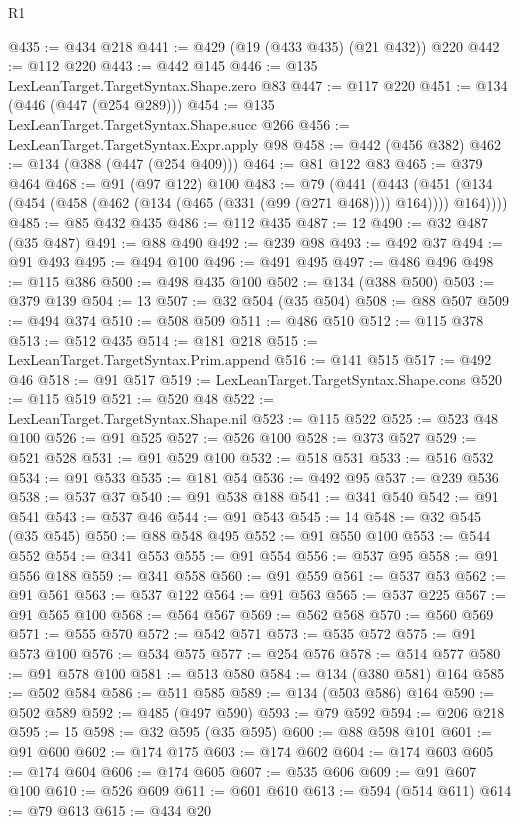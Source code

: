 \begin{lexlean}{R1}
\begin{coremodule}
{{{{{{{{{{{{{{{{{{{{{{{{{{{{{{{{{{{{{{{{{{{{{{{{{{{{{{{{{@435 := @434 @218
@441 := @429 (@19 (@433 @435) (@21 @432)) @220
@442 := @112 @220
@443 := @442 @145
@446 := @135 LexLeanTarget.TargetSyntax.Shape.zero @83
@447 := @117 @220
@451 := @134 (@446 (@447 (@254 @289)))
@454 := @135 LexLeanTarget.TargetSyntax.Shape.succ @266
@456 := LexLeanTarget.TargetSyntax.Expr.apply @98
@458 := @442 (@456 @382)
@462 := @134 (@388 (@447 (@254 @409)))
@464 := @81 @122 @83
@465 := @379 @464
@468 := @91 (@97 @122) @100
@483 := @79
    (@441
      (@443 (@451 (@134 (@454 (@458 (@462 (@134 (@465 (@331 (@99 (@271 @468)))) @164)))) @164))))
@485 := @85 @432 @435
@486 := @112 @435
@487 := 12
@490 := @32 @487 (@35 @487)
@491 := @88 @490
@492 := @239 @98
@493 := @492 @37
@494 := @91 @493
@495 := @494 @100
@496 := @491 @495
@497 := @486 @496
@498 := @115 @386
@500 := @498 @435 @100
@502 := @134 (@388 @500)
@503 := @379 @139
@504 := 13
@507 := @32 @504 (@35 @504)
@508 := @88 @507
@509 := @494 @374
@510 := @508 @509
@511 := @486 @510
@512 := @115 @378
@513 := @512 @435
@514 := @181 @218
@515 := LexLeanTarget.TargetSyntax.Prim.append
@516 := @141 @515
@517 := @492 @46
@518 := @91 @517
@519 := LexLeanTarget.TargetSyntax.Shape.cons
@520 := @115 @519
@521 := @520 @48
@522 := LexLeanTarget.TargetSyntax.Shape.nil
@523 := @115 @522
@525 := @523 @48 @100
@526 := @91 @525
@527 := @526 @100
@528 := @373 @527
@529 := @521 @528
@531 := @91 @529 @100
@532 := @518 @531
@533 := @516 @532
@534 := @91 @533
@535 := @181 @54
@536 := @492 @95
@537 := @239 @536
@538 := @537 @37
@540 := @91 @538 @188
@541 := @341 @540
@542 := @91 @541
@543 := @537 @46
@544 := @91 @543
@545 := 14
@548 := @32 @545 (@35 @545)
@550 := @88 @548 @495
@552 := @91 @550 @100
@553 := @544 @552
@554 := @341 @553
@555 := @91 @554
@556 := @537 @95
@558 := @91 @556 @188
@559 := @341 @558
@560 := @91 @559
@561 := @537 @53
@562 := @91 @561
@563 := @537 @122
@564 := @91 @563
@565 := @537 @225
@567 := @91 @565 @100
@568 := @564 @567
@569 := @562 @568
@570 := @560 @569
@571 := @555 @570
@572 := @542 @571
@573 := @535 @572
@575 := @91 @573 @100
@576 := @534 @575
@577 := @254 @576
@578 := @514 @577
@580 := @91 @578 @100
@581 := @513 @580
@584 := @134 (@380 @581) @164
@585 := @502 @584
@586 := @511 @585
@589 := @134 (@503 @586) @164
@590 := @502 @589
@592 := @485 (@497 @590)
@593 := @79 @592
@594 := @206 @218
@595 := 15
@598 := @32 @595 (@35 @595)
@600 := @88 @598 @101
@601 := @91 @600
@602 := @174 @175
@603 := @174 @602
@604 := @174 @603
@605 := @174 @604
@606 := @174 @605
@607 := @535 @606
@609 := @91 @607 @100
@610 := @526 @609
@611 := @601 @610
@613 := @594 (@514 @611)
@614 := @79 @613
@615 := @434 @20
}}}}}}}}}}}}}}}}}}}}}}}}}}}}}}}}}}}}}}}}}}}}}}}}}}}}}}}}}
\end{coremodule}
\end{lexlean}
